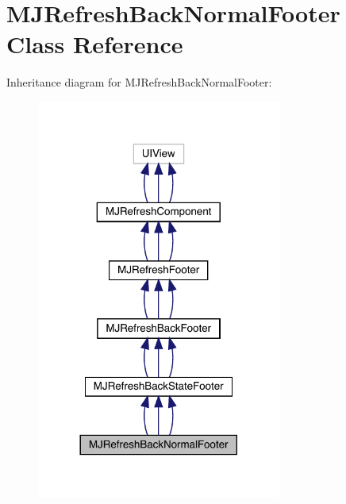 \hypertarget{interface_m_j_refresh_back_normal_footer}{}\section{M\+J\+Refresh\+Back\+Normal\+Footer Class Reference}
\label{interface_m_j_refresh_back_normal_footer}


Inheritance diagram for M\+J\+Refresh\+Back\+Normal\+Footer\+:\nopagebreak
\begin{figure}[H]
\begin{center}
\leavevmode
\includegraphics[width=228pt]{interface_m_j_refresh_back_normal_footer__inherit__graph}
\end{center}
\end{figure}


